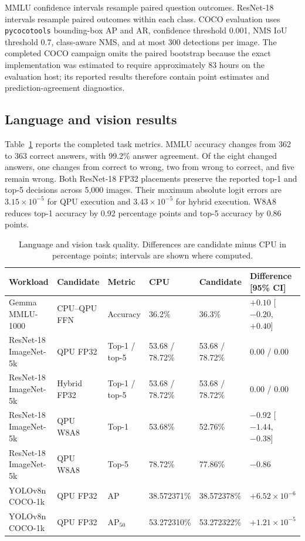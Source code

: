 \documentclass[sigplan,screen,review]{acmart}
\begin{document}
MMLU confidence intervals resample paired question outcomes. ResNet-18 intervals resample paired outcomes within each class. COCO evaluation uses \texttt{pycocotools} bounding-box AP and AR, confidence threshold 0.001, NMS IoU threshold 0.7, class-aware NMS, and at most 300 detections per image. The completed COCO campaign omits the paired bootstrap because the exact implementation was estimated to require approximately 83 hours on the evaluation host; its reported results therefore contain point estimates and prediction-agreement diagnostics.

\subsection{Language and vision results}

Table~\ref{tab:quality-extended} reports the completed task metrics. MMLU accuracy changes from 362 to 363 correct answers, with 99.2\% answer agreement. Of the eight changed answers, one changes from correct to wrong, two from wrong to correct, and five remain wrong. Both ResNet-18 FP32 placements preserve the reported top-1 and top-5 decisions across 5,000 images. Their maximum absolute logit errors are \(3.15\times10^{-5}\) for QPU execution and \(3.43\times10^{-5}\) for hybrid execution. W8A8 reduces top-1 accuracy by 0.92 percentage points and top-5 accuracy by 0.86 points.

\begin{table}[t]
\centering
\caption{Language and vision task quality. Differences are candidate minus CPU in percentage points; intervals are shown where computed.}
\label{tab:quality-extended}
\small
\begin{tabular}{@{}llllll@{}}
\toprule
Workload & Candidate & Metric & CPU & Candidate & Difference [95\% CI] \\
\midrule
Gemma MMLU-1000 & CPU--QPU FFN & Accuracy &
36.2\% & 36.3\% & $+0.10$ [$-0.20$, $+0.40$] \\
ResNet-18 ImageNet-5k & QPU FP32 & Top-1 / top-5 &
53.68 / 78.72\% & 53.68 / 78.72\% & 0.00 / 0.00 \\
ResNet-18 ImageNet-5k & Hybrid FP32 & Top-1 / top-5 &
53.68 / 78.72\% & 53.68 / 78.72\% & 0.00 / 0.00 \\
ResNet-18 ImageNet-5k & QPU W8A8 & Top-1 &
53.68\% & 52.76\% & $-0.92$ [$-1.44$, $-0.38$] \\
ResNet-18 ImageNet-5k & QPU W8A8 & Top-5 &
78.72\% & 77.86\% & $-0.86$ \\
YOLOv8n COCO-1k & QPU FP32 & AP &
38.572371\% & 38.572378\% & $+6.52\times10^{-6}$ \\
YOLOv8n COCO-1k & QPU FP32 & AP$_{50}$ &
53.272310\% & 53.272322\% & $+1.21\times10^{-5}$ \\
\bottomrule
\end{tabular}
\end{table}
\end{document}
